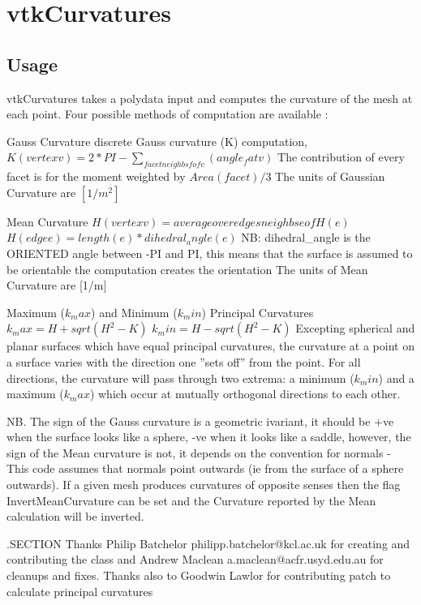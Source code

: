 \section{vtkCurvatures}

\subsection{Usage}

 vtkCurvatures takes a polydata input and computes the curvature of the
 mesh at each point. Four possible methods of computation are available :

 Gauss Curvature
 discrete Gauss curvature (K) computation,
 $K(vertex v) = 2*PI-\sum_{facet neighbs f of v} (angle_f at v)$
 The contribution of every facet is for the moment weighted by $Area(facet)/3$
 The units of Gaussian Curvature are $[1/m^2]$

 Mean Curvature
 $H(vertex v) = average over edges neighbs e of H(e)$
 $H(edge e) = length(e)*dihedral_angle(e)$
 NB: dihedral\_angle is the ORIENTED angle between -PI and PI,
 this means that the surface is assumed to be orientable
 the computation creates the orientation
 The units of Mean Curvature are [1/m]

 Maximum ($k_max$) and Minimum ($k_min$) Principal Curvatures
 $k_max = H + sqrt(H^2 - K)$
 $k_min = H - sqrt(H^2 - K)$
 Excepting spherical and planar surfaces which have equal principal curvatures,
 the curvature at a point on a surface varies with the direction one ''sets off''
 from the point. For all directions, the curvature will pass through two extrema:
 a minimum ($k_min$) and a maximum ($k_max$) which occur at mutually orthogonal
 directions to each other.

 NB. The sign of the Gauss curvature is a geometric ivariant, it should be +ve
 when the surface looks like a sphere, -ve when it looks like a saddle,
 however, the sign of the Mean curvature is not, it depends on the
 convention for normals - This code assumes that normals point outwards (ie
 from the surface of a sphere outwards). If a given mesh produces curvatures
 of opposite senses then the flag InvertMeanCurvature can be set and the
 Curvature reported by the Mean calculation will be inverted.

 .SECTION Thanks
 Philip Batchelor philipp.batchelor@kcl.ac.uk for creating and contributing
 the class and Andrew Maclean a.maclean@acfr.usyd.edu.au for cleanups and 
 fixes. Thanks also to Goodwin Lawlor for contributing patch to calculate
 principal curvatures

